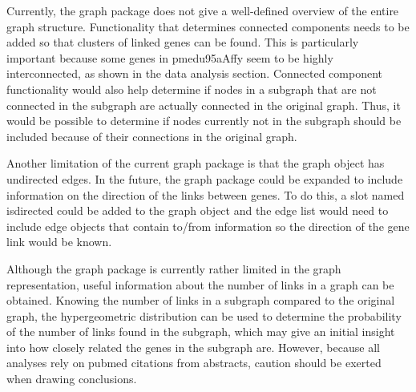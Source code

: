 \documentclass{article}[12pt]
\begin{document}
Currently, the graph package does not give a well-defined overview of the 
entire graph structure.  Functionality that determines connected
components needs to be added so that clusters of linked genes can be found.
This is particularly important because some genes in pmedu95aAffy seem to 
be highly interconnected, as shown in the data analysis section.  Connected
component functionality would also help determine if nodes in a subgraph
that are not connected in the subgraph are actually connected in the original 
graph.  Thus, it would be possible to determine if nodes currently not
in the subgraph should be included because of their connections in the 
original graph.


Another limitation of the current graph package is that the graph object
has undirected edges.  In the future, the graph package could be expanded 
to include information on the direction of the links between genes.  To 
do this, a slot named isdirected could be added to the graph object and 
the edge list would need to include edge objects that contain to/from 
information so the direction of the gene link would be known.  


Although the graph package is currently rather limited in the graph 
representation, useful information about the number of links in a graph 
can be obtained.  Knowing the number of links in a subgraph compared to 
the original graph, the hypergeometric distribution can be used to 
determine the probability of the number of links found in the subgraph, 
which may give an initial insight into how closely related the genes in the 
subgraph are.  However, because all analyses rely on pubmed citations from 
abstracts, caution should be exerted when drawing conclusions.
\end{document}
